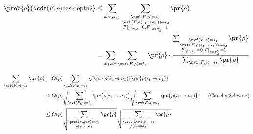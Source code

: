 
\newcommand{\sone}{
    \sum_{
        \substack{
            \nvf(F,\rho) = i_1
            }
        } 
    }
    
\newcommand{\stwo}{
    \sum_{
        \substack{
            \nvf(F,\rho) = i_1 \\ 
            \nvf(F,\rho(i_1 \to a_1)) = i_2 \\ 
            F|_{\rho \circ \sigma_2} = 0, F|_{\rho \circ \sigma_2'} = 1
            }
        }  
    }

\newcommand{\ssone}{ 
    \sum_{
        \substack{   
            \prot(\rho, \rho \circ \sigma_1') = i_1\\
            \rho(i_1) = a_1
            }  
        } 
    }

\newcommand{\ssoneprime}{ 
    \sum_{
        \substack{   
            \prot(\rho \circ \sigma_1,\rho) = i_1\\
            \rho(i_1) = \bar{a_1}            
            }  
        } 
    }

\newcommand{\sstwo}[1]{
    \sum_{
        \substack{
            \prot(\rho,\rho(i_1\to a_1)) = i_1\\ 
            \rho(i_1) = a_1\\
            \nvf(F,\rho) = i_2 \\ 
            F|_{\rho(i_2 \to a_2) = 0, F|_{\rho(i_2 \to \bar{a_2})} = 1}
            } 
        }  #1
    }




\newcommand{\rhoone}{ \rho(i_1\to a_1) }
\newcommand{\rhotwo}{ \rho(i_1\to a_1,i_2\to a_2) }
\newcommand{\rhooneprime}{ \rho(i_1 \to \bar{a_1}) }
\newcommand{\rhotwoprime}{ \rho(i_1\to a_1,i_2 \to \bar{a_2}) }



\begin{align*}
    \prob{\rho}{\cdt(F,\rho) \text{has depth} 2} 
    &\leq  \sum_{x_{i_1},x_{i_2}} 
    \stwo \pr{\rho}\\    
    &= \sum_{x_1,x_2} \sone \pr{\rho}  \cdot \frac{\stwo \pr{\rho} }{\sone  \pr{\rho} }
\end{align*}


\begin{align*}
    \sone \pr{\rho} 
    &= O(p) \sone \sqrt{ \pr{\rhoone} \pr{\rhooneprime}  }\\
    &\leq O(p) \sqrt{ \sone \pr{\rhoone}} \sqrt{ \sone \pr{\rhooneprime}}
    \tag{Cauchy-Schwarz}\\
    &\leq O(p) \sqrt{\ssone \pr{\rho}} \sqrt{ \ssoneprime \pr{\rho} }
\end{align*}

